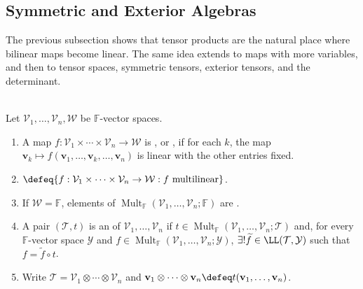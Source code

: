 \subsection{Symmetric and Exterior Algebras}


The previous subsection shows that tensor products are the natural place where bilinear maps become linear. The same idea extends to maps with more variables, and then to tensor spaces, symmetric tensors, exterior tensors, and the determinant.

\begin{definition} \label{def:multilinear-map}\label{def:iterated-tensor-product-universal-property} \\
Let $\mathcal{V}_1,\ldots,\mathcal{V}_n,\mathcal{W}$ be $\mathbb{F}$-vector spaces.
\begin{enumerate}[label=(\roman*)]
\setlength{\itemsep}{0pt}
\item A map $f:\mathcal{V}_1\times\cdots\times\mathcal{V}_n\to\mathcal{W}$ is , or , if for each $k$, the map $\mathbf{v}_k\mapsto f(\mathbf{v}_1,\ldots,\mathbf{v}_k,\ldots,\mathbf{v}_n)$ is linear with the other entries fixed.
\item {}$\defeq\{f:\mathcal{V}_1\times\cdots\times\mathcal{V}_n\to\mathcal{W}:f\text{ multilinear}\}$.
\item If $\mathcal{W}=\mathbb{F}$, elements of $\operatorname{Mult}_{\mathbb{F}}(\mathcal{V}_1,\ldots,\mathcal{V}_n;\mathbb{F})$ are .
\item A pair $(\mathcal{T},t)$ is an  of $\mathcal{V}_1,\ldots,\mathcal{V}_n$ if $t\in\operatorname{Mult}_{\mathbb{F}}(\mathcal{V}_1,\ldots,\mathcal{V}_n;\mathcal{T})$ and, for every $\mathbb{F}$-vector space $\mathcal{Y}$ and $f\in\operatorname{Mult}_{\mathbb{F}}(\mathcal{V}_1,\ldots,\mathcal{V}_n;\mathcal{Y})$, $\exists!\widetilde{f}\in\LL(\mathcal{T},\mathcal{Y})$ such that $f=\widetilde{f}\circ t$.
\item Write $\mathcal{T}=\mathcal{V}_1\otimes\cdots\otimes\mathcal{V}_n$ and $\mathbf{v}_1\otimes\cdots\otimes\mathbf{v}_n\defeq t(\mathbf{v}_1,\ldots,\mathbf{v}_n)$.
\end{enumerate}
\end{definition}

